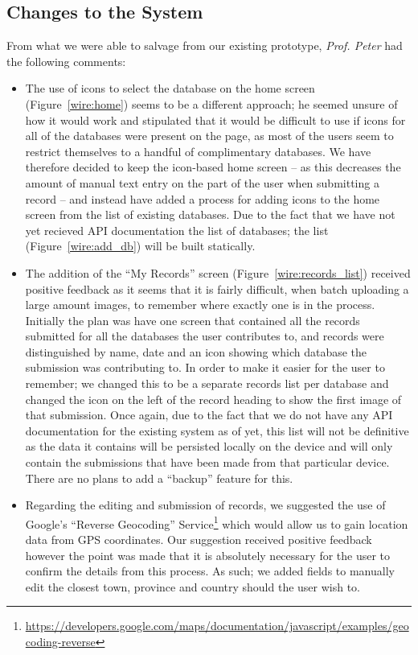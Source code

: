 \documentclass[
10pt, %
a4paper, %
oneside, %
headinclude,footinclude, %
BCOR5mm, %
]{scrartcl}
\begin{document}

\subsection{Changes to the System} %
\label{sub:changes_to_the_system}

From what we were able to salvage from our existing prototype, \textit{Prof. Peter} had the following comments:

\begin{itemize}
\item The use of icons to select the database on the home screen (Figure~\vref{wire:home}) seems to be a different approach; he seemed unsure of how it would work and stipulated that it would be difficult to use if icons for all of the databases were present on the page, as most of the users seem to restrict themselves to a handful of complimentary databases. We have therefore decided to keep the icon-based home screen -- as this decreases the amount of manual text entry on the part of the user when submitting a record -- and instead have added a process for adding icons to the home screen from the list of existing databases. Due to the fact that we have not yet recieved API documentation the list of databases; the list (Figure~\vref{wire:add_db}) will be built statically.
\item The addition of the ``My Records'' screen (Figure~\vref{wire:records_list}) received positive feedback as it seems that it is fairly difficult, when batch uploading a large amount images, to remember where exactly one is in the process. Initially the plan was have one screen that contained all the records submitted for all the databases the user contributes to, and records were distinguished by name, date and an icon showing which database the submission was contributing to. In order to make it easier for the user to remember; we changed this to be a separate records list per database and changed the icon on the left of the record heading to show the first image of that submission. Once again, due to the fact that we do not have any API documentation for the existing system as of yet, this list will not be definitive as the data it contains will be persisted locally on the device and will only contain the submissions that have been made from that particular device. There are no plans to add a ``backup'' feature for this.
\item Regarding the editing and submission of records, we suggested the use of Google's ``Reverse Geocoding'' Service\footnote{\url{https://developers.google.com/maps/documentation/javascript/examples/geocoding-reverse}} which would allow us to gain location data from GPS coordinates. Our suggestion received positive feedback however the point was made that it is absolutely necessary for the user to confirm the details from this process. As such; we added fields to manually edit the closest town, province and country should the user wish to.
\end{itemize}
\end{document}
